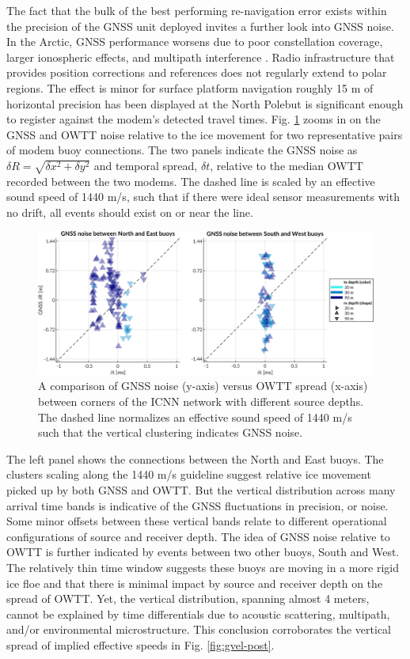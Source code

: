 \documentclass[preprint,TurnOnLineNumbers]{JASA}
\begin{document}
The fact that the bulk of the best performing re-navigation error exists within the precision of the GNSS unit deployed invites a further look into GNSS noise.
In the Arctic, GNSS performance worsens due to poor constellation coverage, larger ionospheric effects, and multipath interference \citep{NAP12914,swanlund_gps_2016,Themens2015,Gwal2011,Jung2018,Reid2016}.
Radio infrastructure that provides position corrections and references does not regularly extend to polar regions.
The effect is minor for surface platform navigation \textemdash roughly 15 m of horizontal precision has been displayed at the North Pole\textemdash but is significant enough to register against the modem's detected travel times.
Fig. \ref{fig:gps-drift-example} zooms in on the GNSS and OWTT noise relative to the ice movement for two representative pairs of modem buoy connections.
The two panels indicate the GNSS noise as $\delta R = \sqrt{\delta x^2 + \delta y^2}$ and temporal spread, $\delta t$, relative to the median OWTT recorded between the two modems.
The dashed line is scaled by an effective sound speed of 1440 m/s, such that if there were ideal sensor measurements with no drift, all events should exist on or near the line.

\begin{figure}[!ht]
    \centering
    \includegraphics[width=\columnwidth]{Fig13.pdf} 
    \caption{A comparison of GNSS noise (y-axis) versus OWTT spread (x-axis) between corners of the ICNN network with different source depths. The dashed line normalizes an effective sound speed of 1440 m/s such that the vertical clustering indicates GNSS noise.}
    \label{fig:gps-drift-example}
\end{figure}

The left panel shows the connections between the North and East buoys.
The clusters scaling along the 1440 m/s guideline suggest relative ice movement picked up by both GNSS and OWTT.
But the vertical distribution across many arrival time bands is indicative of the GNSS fluctuations in precision, or noise.
Some minor offsets between these vertical bands relate to different operational configurations of source and receiver depth.
The idea of GNSS noise relative to OWTT is further indicated by events between two other buoys, South and West.
The relatively thin time window suggests these buoys are moving in a more rigid ice floe and that there is minimal impact by source and receiver depth on the spread of OWTT.
Yet, the vertical distribution, spanning almost 4 meters, cannot be explained by time differentials due to acoustic scattering, multipath, and/or environmental microstructure.
This conclusion corroborates the vertical spread of implied effective speeds in Fig. \ref{fig:gvel-post}.
\end{document}
